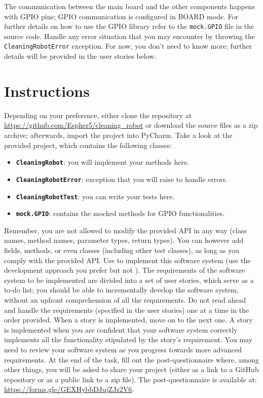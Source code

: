 The communication between the main board and the other components happens with GPIO pins; GPIO communication is configured in BOARD mode. For further details on how to use the GPIO library refer to the \texttt{mock.GPIO} file in the source code.
Handle any error situation that you may encounter by throwing the \texttt{CleaningRobotError} exception.
For now, you don't need to know more; further details will be provided in the user stories below.

\section{Instructions}
Depending on your preference, either clone the repository at \url{https://github.com/Espher5/cleaning_robot} or download the source files as a zip archive; afterwards, import the project into PyCharm. 
Take a look at the provided project, which contains the following classes: 
\begin{itemize}
    \item \textbf{\texttt{CleaningRobot}}: you will implement your methods here.
    \item \textbf{\texttt{CleaningRobotError}}: exception that you will raise to handle errors.
    \item \textbf{\texttt{CleaningRobotTest}}: you can write your tests here.
    \item \textbf{\texttt{mock.GPIO}}: contains the mocked methods for GPIO functionalities.
\end{itemize}


Remember, you are not allowed to modify the provided API in any way (\ie class names, method names, parameter types, return types). You can however add fields, methods, or even classes (including other test classes), as long as you comply with the provided API.
Use \notdd to implement this software system (\ie use the development approach you prefer but not \tdd).
The requirements of the software system to be implemented are divided into a set of user stories, which serve as a to-do list; you should be able to incrementally develop the software system, without an upfront comprehension of all the requirements. Do not read ahead and handle the requirements (\ie specified in the user stories) one at a time in the order provided.
When a story is implemented, move on to the next one. A story is implemented when you are confident that your software system correctly implements all the functionality stipulated by the story's requirement. You may need to review your software system as you progress towards more advanced requirements.
At the end of the task, fill out the post-questionnaire where, among other things, you will be asked to share your project (either as a link to a GitHub repository or as a public link to a zip file). The post-questionnaire is available at: \url{https://forms.gle/GEXHybbDJujZJz2V6}.


